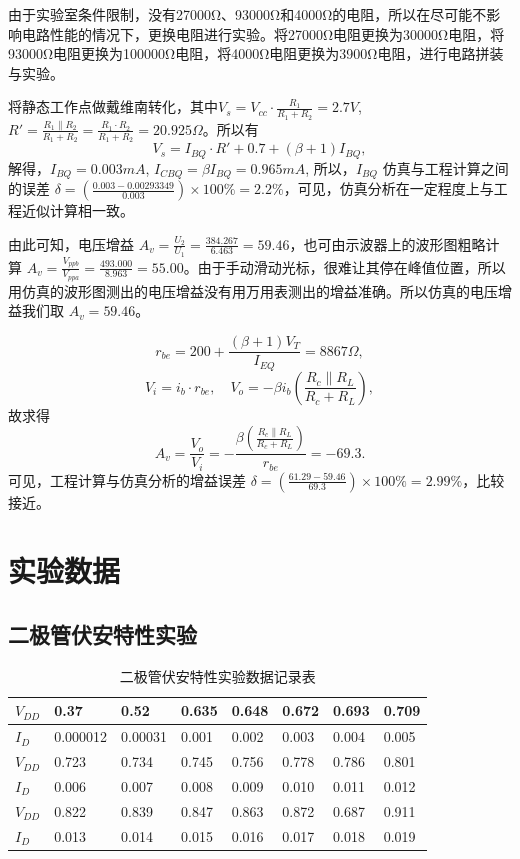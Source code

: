 \documentclass[]{article}
\begin{document}
由于实验室条件限制，没有27000Ω、93000Ω和4000Ω的电阻，所以在尽可能不影响电路性能的情况下，更换电阻进行实验。将27000Ω电阻更换为30000Ω电阻，将93000Ω电阻更换为100000Ω电阻，将4000Ω电阻更换为3900Ω电阻，进行电路拼装与实验。



	将静态工作点做戴维南转化，其中$V_s = V_{cc} \cdot \frac{R_1}{R_1 + R_2} = 2.7V$, $R' = \frac{R_1 \parallel R_2}{R_1 + R_2} = \frac{R_1 \cdot R_2}{R_1 + R_2} = 20.925\Omega$。所以有 
	\[ V_s = I_{BQ} \cdot R' + 0.7 + (\beta + 1) I_{BQ}, \]
	解得，$I_{BQ} = 0.003mA$, $I_{CBQ} = \beta I_{BQ} = 0.965mA$, 所以，$I_{BQ}$ 仿真与工程计算之间的误差 $\delta = \left( \frac{0.003 - 0.00293349}{0.003} \right) \times 100\% = 2.2\%$，可见，仿真分析在一定程度上与工程近似计算相一致。
	
	由此可知，电压增益 $A_v = \frac{U_2}{U_1} = \frac{384.267}{6.463} = 59.46$，也可由示波器上的波形图粗略计算 $A_v = \frac{V_{ppb}}{V_{ppa}} = \frac{493.000}{8.963} = 55.00$。由于手动滑动光标，很难让其停在峰值位置，所以用仿真的波形图测出的电压增益没有用万用表测出的增益准确。所以仿真的电压增益我们取 $A_v = 59.46$。
	
	\[ r_{be} = 200 + \frac{(\beta + 1) V_T}{I_{EQ}} = 8867\Omega, \]
	\[ V_i = i_b \cdot r_{be}, \quad V_o = -\beta i_b \left( \frac{R_c \parallel R_L}{R_c + R_L} \right), \]
	故求得 
	\[ A_v = \frac{V_o}{V_i} = -\frac{\beta \left( \frac{R_c \parallel R_L}{R_c + R_L} \right)}{r_{be}} = -69.3. \]
	可见，工程计算与仿真分析的增益误差 $\delta = \left( \frac{61.29 - 59.46}{69.3} \right) \times 100\% = 2.99\%$，比较接近。
	


\section{实验数据}

\subsection{二极管伏安特性实验}


\begin{table}[htbp]
	\centering
	\caption{二极管伏安特性实验数据记录表}
	
	\begin{tabular}{llllllll}
		\hline
		$ V_{DD} $ & 0.37     & 0.52    & 0.635 & 0.648 & 0.672 & 0.693 & 0.709 \\
		\hline
		$ I_D $  & 0.000012 & 0.00031 & 0.001 & 0.002 & 0.003 & 0.004 & 0.005 \\
		\hline
		\hline
		$ V_{DD} $ & 0.723     & 0.734    & 0.745 & 0.756 & 0.778 & 0.786 & 0.801 \\
		\hline
		$ I_D $  & 0.006 & 0.007 & 0.008 & 0.009 & 0.010 & 0.011 & 0.012 \\
		\hline
		\hline
		$ V_{DD} $ & 0.822     & 0.839    & 0.847 & 0.863 & 0.872 & 0.687 & 0.911 \\
		\hline
		$ I_D $  & 0.013 & 0.014 & 0.015 & 0.016 & 0.017 & 0.018 & 0.019 \\
		\hline
	\end{tabular}
	
\end{table}
\end{document}
